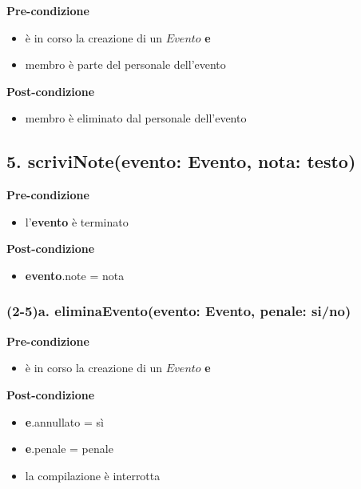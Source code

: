 \documentclass[14pt]{extarticle}
\begin{document}
\textbf{Pre-condizione}
\begin{itemize}
  \item è in corso la creazione di un $Evento$ \textbf{e}
  \item membro è parte del personale dell'evento
\end{itemize}
\textbf{Post-condizione}
\begin{itemize}
  \item membro è eliminato dal personale dell'evento
\end{itemize}


\subsection*{5. scriviNote(evento: Evento, nota: testo)}

\textbf{Pre-condizione}
\begin{itemize}
  \item l'\textbf{evento} è terminato
\end{itemize}
\textbf{Post-condizione}
\begin{itemize}
  \item \textbf{evento}.note = nota
\end{itemize}


\subsubsection*{(2-5)a. eliminaEvento(evento: Evento, penale: si/no)}

\textbf{Pre-condizione}
\begin{itemize}
  \item è in corso la creazione di un $Evento$ \textbf{e}
\end{itemize}
\textbf{Post-condizione}
\begin{itemize}
  \item \textbf{e}.annullato = sì
  \item \textbf{e}.penale = penale
  \item la compilazione è interrotta
\end{itemize}  
\end{document}
